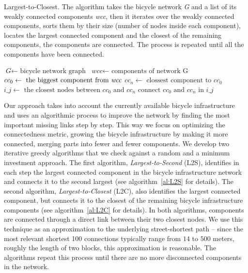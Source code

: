 \begin{algorithm}[h!]
  \caption{Largest-to-Closest. The algorithm takes the bicycle network \textit{G} and a list of its weakly connected components \textit{wcc}, then it iterates over the weakly connected components, sorts them by their size (number of nodes inside each component), locates the largest connected component and the closest of the remaining components, the components are connected. The process is repeated until all the components have been connected.}\label{al:L2C}
  \begin{algorithmic}[1]
    \State $\textit{G} \gets \text{ bicycle network graph}$
    \State $\textit{wcc} \gets \text{ components of network G}$
    \State  {}
    \State $cc_0 \gets \text{ the biggest component from \textit{wcc}}$
    \State $cc_n \gets \text{ clossest component to } cc_0$
    \State $\textit{i\_j} \gets \text{ the closest nodes between } cc_0 \text{ and } cc_n$
    \State $\text{connect } cc_0 \text{ and } cc_n \text{ in } i\_j$
    \EndFor
    \EndProcedure
  \end{algorithmic}
\end{algorithm}

Our approach takes into account the currently available bicycle infrastructure and uses an algorithmic process to improve the network by finding the most important missing links step by step. This way we focus on optimizing the connectedness metric, growing the bicycle infrastructure by making it more connected, merging parts into fewer and fewer components. We develop two iterative greedy algorithms that we check against a random and a minimum investment approach. The first algorithm, \emph{Largest-to-Second} (L2S), identifies in each step the largest connected component in the bicycle infrastructure network and connects it to the second largest (see algorithm~\ref{al:L2S} for details). The second algorithm, \emph{Largest-to-Closest} (L2C), also identifies the largest connected component, but connects it to the closest of the remaining bicycle infrastructure components (see algorithm~\ref{al:L2C} for details). In both algorithms, components are connected through a direct link between their two closest nodes. We use this technique as an approximation to the underlying street-shortest path -- since the most relevant shortest 100 connections typically range from $14$ to $500$ meters, roughly the length of two blocks, this approximation is reasonable. The algorithms repeat this process until there are no more disconnected components in the network.

